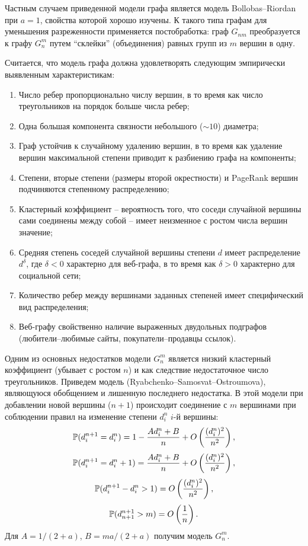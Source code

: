 \begin{remark}
Частным случаем приведенной модели графа является модель Bollobas--Riordan при $a = 1$, свойства которой хорошо изучены. К такого типа графам для уменьшения разреженности применяется постобработка: граф $G_{nm}$ преобразуется к графу $G_n^{m}$ путем ``склейки'' (объединения) равных групп из $m$ вершин в одну.

Считается, что модель графа должна удовлетворять следующим эмпирически выявленным характеристикам:
\begin{enumerate}
\item Число ребер пропорционально числу вершин, в то время как число треугольников на порядок больше числа ребер;
\item Одна большая компонента связности небольшого ($\sim 10$) диаметра;
\item Граф устойчив к случайному удалению вершин, в то время как удаление вершин максимальной степени приводит к разбиению графа на компоненты;
\item Степени, вторые степени (размеры второй окрестности) и PageRank вершин подчиняются степенному распределению;
\item Кластерный коэффициент -- вероятность того, что соседи случайной вершины  сами соединены между собой -- имеет неизменное с ростом числа вершин значение;
\item Средняя степень соседей случайной вершины степени $d$ имеет распределение $d^{\delta}$, где $\delta < 0$ характерно для веб-графа,  в то время как $\delta > 0$ характерно для социальной сети;
\item Количество ребер между вершинами заданных степеней имеет специфический вид распределения;
\item  Веб-графу свойственно наличие выраженных двудольных подграфов 
(любители--любимые сайты, покупатели--продавцы ссылок).  
\end{enumerate}
Одним из основных недостатков модели $G_n^{m}$ является низкий кластерный коэффициент (убывает с ростом $n$) и как следствие недостаточное число треугольников. Приведем модель (Ryabchenko--Samosvat--Ostroumova), являющуюся обобщением и лишенную последнего недостатка. В этой модели при добавлении новой вершины ($n+1$) происходит соединение с $m$ вершинами при соблюдении правил на изменение степени $d_i^{n}$ $i$-й вершины:
\[
\mathrm{{\mathbb P}}(d_i^{n+1} = d_i^{n}) = 1 - \frac{A d_i^{n} + B}{n} + O\left( \frac{(d_i^n)^2}{n^2} \right),
\]
\[
\mathrm{{\mathbb P}}(d_i^{n+1} = d_i^{n} + 1) = \frac{A d_i^{n} + B}{n} + O\left( \frac{(d_i^n)^2}{n^2} \right),
\]
\[
\mathrm{{\mathbb P}}(d_i^{n+1} - d_i^{n}  > 1) =  O\left( \frac{(d_i^n)^2}{n^2} \right),
\]
\[
\mathrm{{\mathbb P}}(d_{n+1}^{n+1} > m) =  O\left( \frac{1}{n} \right).
\]
Для $A = 1/(2+a)$, $B = ma/(2+a)$ получим модель $G_n^m$.

\end{remark}


